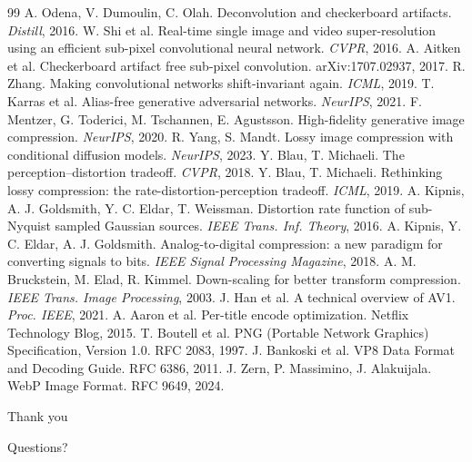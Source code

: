 \documentclass[aspectratio=169]{beamer}
\begin{document}
\begin{frame}[t]
  \tiny
  \begin{thebibliography}{99}
     A. Odena, V. Dumoulin, C. Olah. Deconvolution and checkerboard artifacts. \emph{Distill}, 2016.
     W. Shi et al. Real-time single image and video super-resolution using an efficient sub-pixel convolutional neural network. \emph{CVPR}, 2016.
     A. Aitken et al. Checkerboard artifact free sub-pixel convolution. arXiv:1707.02937, 2017.
     R. Zhang. Making convolutional networks shift-invariant again. \emph{ICML}, 2019.
     T. Karras et al. Alias-free generative adversarial networks. \emph{NeurIPS}, 2021.
     F. Mentzer, G. Toderici, M. Tschannen, E. Agustsson. High-fidelity generative image compression. \emph{NeurIPS}, 2020.
     R. Yang, S. Mandt. Lossy image compression with conditional diffusion models. \emph{NeurIPS}, 2023.
     Y. Blau, T. Michaeli. The perception--distortion tradeoff. \emph{CVPR}, 2018.
     Y. Blau, T. Michaeli. Rethinking lossy compression: the rate-distortion-perception tradeoff. \emph{ICML}, 2019.
     A. Kipnis, A. J. Goldsmith, Y. C. Eldar, T. Weissman. Distortion rate function of sub-Nyquist sampled Gaussian sources. \emph{IEEE Trans. Inf. Theory}, 2016.
     A. Kipnis, Y. C. Eldar, A. J. Goldsmith. Analog-to-digital compression: a new paradigm for converting signals to bits. \emph{IEEE Signal Processing Magazine}, 2018.
     A. M. Bruckstein, M. Elad, R. Kimmel. Down-scaling for better transform compression. \emph{IEEE Trans. Image Processing}, 2003.
     J. Han et al. A technical overview of AV1. \emph{Proc. IEEE}, 2021.
     A. Aaron et al. Per-title encode optimization. Netflix Technology Blog, 2015.
     T. Boutell et al. PNG (Portable Network Graphics) Specification, Version 1.0. RFC 2083, 1997.
     J. Bankoski et al. VP8 Data Format and Decoding Guide. RFC 6386, 2011.
     J. Zern, P. Massimino, J. Alakuijala. WebP Image Format. RFC 9649, 2024.
  \end{thebibliography}
\end{frame}

\begin{frame}[plain]
  \begin{center}
    {\Huge Thank you}

    \bigskip
    {\Large Questions?}
  \end{center}
\end{frame}
\end{document}
